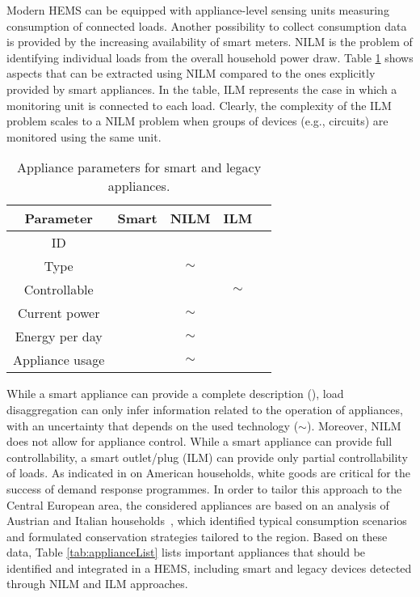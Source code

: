\documentclass{article}
\newcommand{\cmark}{\ding{51}}\newcommand{\xmark}{\ding{55}}
\begin{document}
Modern \ac{HEMS} can be equipped with appliance-level sensing units measuring consumption of connected loads.
Another possibility to collect consumption data is provided by the increasing availability of smart meters.
\ac{NILM} is the problem of identifying individual loads from the overall household power draw.
Table \ref{tab:datasheet} shows aspects that can be extracted using \ac{NILM} compared to the ones explicitly provided by smart appliances.
In the table, \ac{ILM} represents the case in which a monitoring unit is connected to each load.
Clearly, the complexity of the \ac{ILM} problem scales to a \ac{NILM} problem when groups of devices (e.g., circuits) are monitored using the same unit.
\begin{table}
 \centering
 \begin{tabular}{c|cccc}
\hline
Parameter & Smart & \ac{NILM}  & \ac{ILM} \\
\hline
ID 				& \cmark & \cmark	& \cmark \\
Type 			& \cmark & $\sim$	& \cmark	\\
Controllable 	& \cmark & \xmark	& $\sim$	\\
Current power 	& \cmark & $\sim$	& \cmark\\
Energy per day 	& \cmark & $\sim$	& \cmark	\\
Appliance usage & \cmark & $\sim$	& \cmark	\\
\hline
\end{tabular}
\caption{Appliance parameters for smart and legacy appliances.}
\label{tab:datasheet}
\end{table}
While a smart appliance can provide a complete description (\cmark), load disaggregation can only infer information related to the operation of appliances, with an uncertainty that depends on the used technology ($\sim$).
Moreover, \ac{NILM} does not allow for appliance control.
While a smart appliance can provide full controllability, a smart outlet/plug (\ac{ILM}) can provide only partial controllability of loads.
As indicated in \cite{Carlson2013132} on American households, white goods are critical for the success of demand response programmes.
In order to tailor this approach to the Central European area, the considered appliances are based on an analysis of Austrian and Italian households~\cite{monacchi:2013Nov}, which identified typical consumption scenarios and formulated conservation strategies tailored to the region.
Based on these data, Table \ref{tab:applianceList} lists important appliances that should be identified and integrated in a HEMS, including smart and legacy devices detected through \ac{NILM} and \ac{ILM} approaches.
\end{document}
